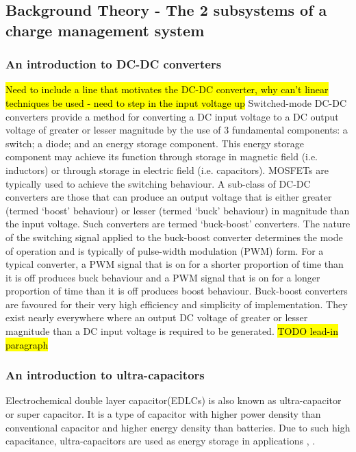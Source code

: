 \subsection{Background Theory - The 2 subsystems of a charge management system}
\subsubsection{An introduction to DC-DC converters}
\hl{Need to include a line that motivates the DC-DC converter, why can't linear techniques be used - need to step in the input voltage up}
Switched-mode DC-DC converters provide a method for converting a DC input voltage to a DC output voltage of greater or lesser magnitude by the use of 3 fundamental components: a switch; a diode; and an energy storage component. This energy storage component may achieve its function through storage in magnetic field (i.e. inductors) or through storage in electric field (i.e. capacitors). MOSFETs are typically used to achieve the switching behaviour.
\newpar
A sub-class of DC-DC converters are those that can produce an output voltage that is either greater (termed `boost' behaviour) or lesser (termed `buck' behaviour) in magnitude than the input voltage. Such converters are termed `buck-boost' converters. The nature of the switching signal applied to the buck-boost converter determines the mode of operation and is typically of pulse-width modulation (PWM) form. For a typical converter, a PWM signal that is on for a shorter proportion of time than it is off produces buck behaviour and a PWM signal that is on for a longer proportion of time than it is off produces boost behaviour.
\newpar
Buck-boost converters are favoured for their very high efficiency and simplicity of implementation. They exist nearly everywhere where an output DC voltage of greater or lesser magnitude than a DC input voltage is required to be generated.
\newpar
\hl{TODO lead-in paragraph}
\subsubsection{An introduction to ultra-capacitors}
Electrochemical double layer capacitor(EDLCs) is also known as ultra-capacitor or super capacitor. It is a type of capacitor with higher power density than conventional capacitor and higher energy density than batteries. Due to such high capacitance, ultra-capacitors are used as energy storage in applications \cite{maxwell}, \cite{murata}. 

